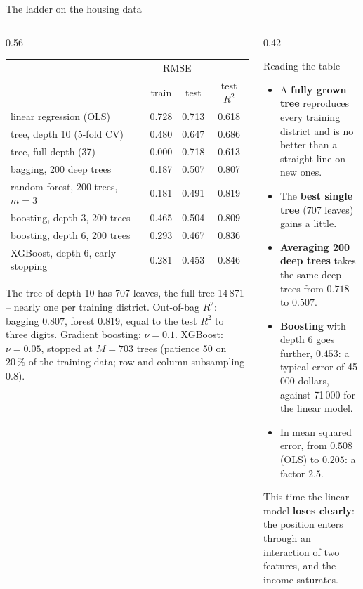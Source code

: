 \documentclass[10pt,aspectratio=169]{beamer}
\begin{document}
\begin{frame}{The ladder on the housing data}
\begin{columns}[T]
\begin{column}{0.56\textwidth}
\scriptsize
\setlength{\tabcolsep}{4pt}
\begin{tabular}{@{}lccc@{}}
\toprule
 & \multicolumn{2}{c}{RMSE} & \\
 & train & test & test $R^2$\\
\midrule
linear regression (OLS) & 0.728 & 0.713 & 0.618\\
\midrule
tree, depth 10 (5-fold CV) & 0.480 & 0.647 & 0.686\\
tree, full depth (37) & 0.000 & 0.718 & 0.613\\
\midrule
bagging, 200 deep trees & 0.187 & 0.507 & 0.807\\
random forest, 200 trees, $m=3$ & 0.181 & 0.491 & 0.819\\
\midrule
boosting, depth 3, 200 trees & 0.465 & 0.504 & 0.809\\
boosting, depth 6, 200 trees & 0.293 & 0.467 & 0.836\\
XGBoost, depth 6, early stopping & 0.281 & 0.453 & 0.846\\
\bottomrule
\end{tabular}

\medskip
\footnotesize
The tree of depth 10 has 707 leaves, the full tree 14\,871 -- nearly one
per training district.  Out-of-bag $R^2$: bagging $0.807$, forest $0.819$,
equal to the test $R^2$ to three digits.  Gradient boosting: $\nu=0.1$.
XGBoost: $\nu=0.05$, stopped at $M=703$ trees (patience 50 on $20\,\%$ of
the training data; row and column subsampling $0.8$).
\end{column}
\begin{column}{0.42\textwidth}
\footnotesize
\begin{block}{Reading the table}
\begin{itemize}
  \item A \textbf{fully grown tree} reproduces every training district and
    is no better than a straight line on new ones.
  \item The \textbf{best single tree} (707 leaves) gains a little.
  \item \textbf{Averaging 200 deep trees} takes the same deep trees from
    $0.718$ to $0.507$.
  \item \textbf{Boosting} with depth 6 goes further, $0.453$: a typical
    error of 45\,000 dollars, against 71\,000 for the linear model.
  \item In mean squared error, from $0.508$ (OLS) to $0.205$: a factor
    $2.5$.
\end{itemize}
\end{block}
This time the linear model \textbf{loses clearly}: the position enters
through an interaction of two features, and the income saturates.
\end{column}
\end{columns}
\end{frame}
\end{document}
